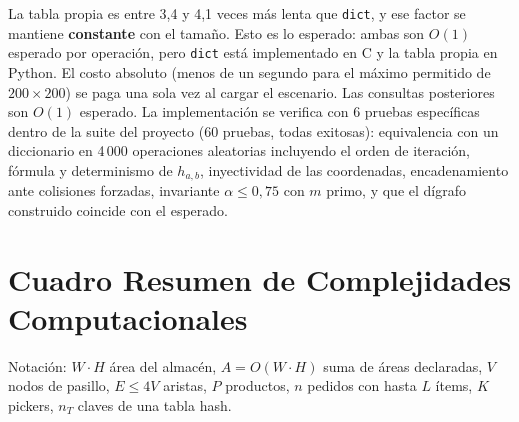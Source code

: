 \documentclass[11pt,a4paper]{article}
\theoremstyle{definition}
\begin{document}
La tabla propia es entre 3,4 y 4,1 veces más lenta que \texttt{dict}, y ese factor se mantiene \textbf{constante} con el tamaño. Esto es lo esperado: ambas son $O(1)$ esperado por operación, pero \texttt{dict} está implementado en C y la tabla propia en Python. El costo absoluto (menos de un segundo para el máximo permitido de $200\times200$) se paga una sola vez al cargar el escenario. Las consultas posteriores son $O(1)$ esperado. La implementación se verifica con 6 pruebas específicas dentro de la suite del proyecto (60 pruebas, todas exitosas): equivalencia con un diccionario en 4\,000 operaciones aleatorias incluyendo el orden de iteración, fórmula y determinismo de $h_{a,b}$, inyectividad de las coordenadas, encadenamiento ante colisiones forzadas, invariante $\alpha\le0{,}75$ con $m$ primo, y que el dígrafo construido coincide con el esperado.

\section{Cuadro Resumen de Complejidades Computacionales}

Notación: $W\cdot H$ área del almacén, $A=O(W\cdot H)$ suma de áreas declaradas, $V$ nodos de pasillo, $E\le4V$ aristas, $P$ productos, $n$ pedidos con hasta $L$ ítems, $K$ pickers, $n_T$ claves de una tabla hash.
\end{document}
